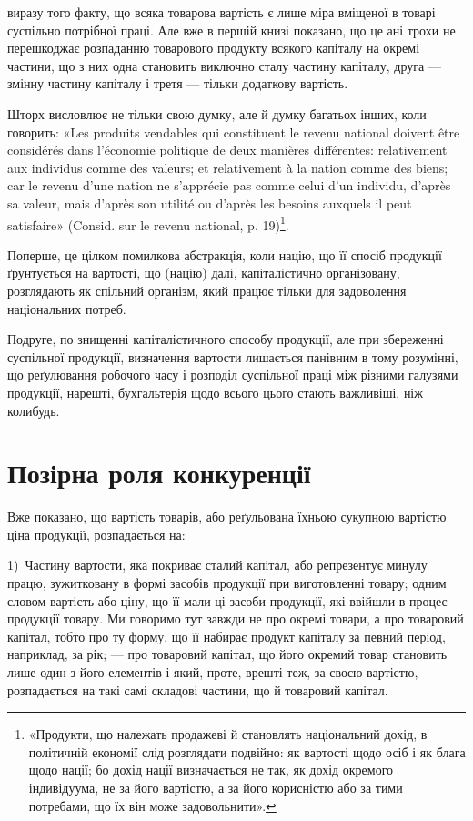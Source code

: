 \parcont{}  %
виразу того факту, що всяка товарова вартість є лише міра вміщеної в товарі
суспільно потрібної праці. Але вже в першій книзі показано, що це ані трохи
не перешкоджає розпаданню товарового продукту всякого капіталу на окремі
частини, що з них одна становить виключно сталу частину капіталу, друга —
змінну частину капіталу і третя — тільки додаткову вартість.

Шторх висловлює не тільки свою думку, але й думку багатьох інших,
коли говорить: «Les produits vendables qui constituent le revenu national doivent
être considérés dans l’économie politique de deux manières différentes: relativement aux
individus comme des valeurs; et relativement à la nation comme des biens; car le
revenu d’une nation ne s’apprécie pas comme celui d’un individu, d’après sa valeur,
mais d’après son utilité ou d’après les besoins auxquels il peut satisfaire» (Consid.
sur le revenu national, p. 19)\footnote*{
«Продукти, що належать продажеві й становлять національний дохід, в політичній економії слід
розглядати подвійно: як вартості щодо осіб і як блага щодо нації; бо дохід нації визначається не
так, як дохід окремого індивідуума, не за його вартістю, а за його корисністю або за тими потребами,
що їх він може задовольнити».
}.

Поперше, це цілком помилкова абстракція, коли націю, що її спосіб продукції
ґрунтується на вартості, що (націю) далі, капіталістично організовану,
розглядають як спільний організм, який працює тільки для задоволення національних
потреб.

Подруге, по знищенні капіталістичного способу продукції, але при збереженні
суспільної продукції, визначення вартости лишається панівним в тому
розумінні, що реґулювання робочого часу і розподіл суспільної праці між різними
галузями продукції, нарешті, бухгальтерія щодо всього цього стають
важливіші, ніж колибудь.

\section{Позірна роля конкуренції}

Вже показано, що вартість товарів, або реґульована їхньою сукупною вартістю
ціна продукції, розпадається на:

1)~Частину вартости, яка покриває сталий капітал, або репрезентує минулу
працю, зужитковану в формі засобів продукції при виготовленні товару; одним
словом вартість або ціну, що її мали ці засоби продукції, які ввійшли в процес
продукції товару. Ми говоримо тут завжди не про окремі товари, а про товаровий
капітал, тобто про ту форму, що її набирає продукт капіталу за певний
період, наприклад, за рік; — про товаровий капітал, що його окремий товар
становить лише один з його елементів і який, проте, врешті теж, за своєю
вартістю, розпадається на такі самі складові частини, що й товаровий капітал.

